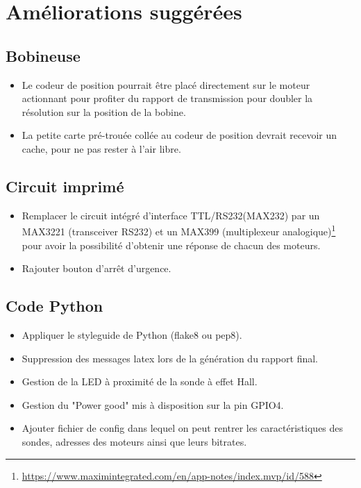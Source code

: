 \documentclass[12pt,a4paper]{article}
\begin{document}
\section{Améliorations suggérées}
\subsection{Bobineuse}
\begin{itemize}\itemsep=6pt
\item Le codeur de position pourrait être placé directement sur le moteur actionnant pour profiter du rapport de transmission pour doubler la résolution sur la position de la bobine.
\item La petite carte pré-trouée collée au codeur de position devrait recevoir un cache, pour ne pas rester à l'air libre. 
\end{itemize}


\subsection{Circuit imprimé}
\begin{itemize}\itemsep=6pt
\item Remplacer le circuit intégré d'interface TTL/RS232(MAX232) par un MAX3221 (transceiver RS232) et un MAX399 (multiplexeur analogique)\footnote{\url{https://www.maximintegrated.com/en/app-notes/index.mvp/id/588}} pour avoir la possibilité d'obtenir une réponse de chacun des moteurs. 
\item Rajouter bouton d'arrêt d'urgence.
\end{itemize}

\subsection{Code Python}
\begin{itemize}\itemsep=6pt
\item Appliquer le styleguide de Python (flake8 ou pep8).
\item Suppression des messages latex lors de la génération du rapport final.
\item Gestion de la LED à proximité de la sonde à effet Hall.
\item Gestion du "Power good" mis à disposition sur la pin GPIO4.
\item Ajouter fichier de config dans lequel on peut rentrer les caractéristiques des sondes, adresses des moteurs ainsi que leurs bitrates.
\end{itemize}
\end{document}

